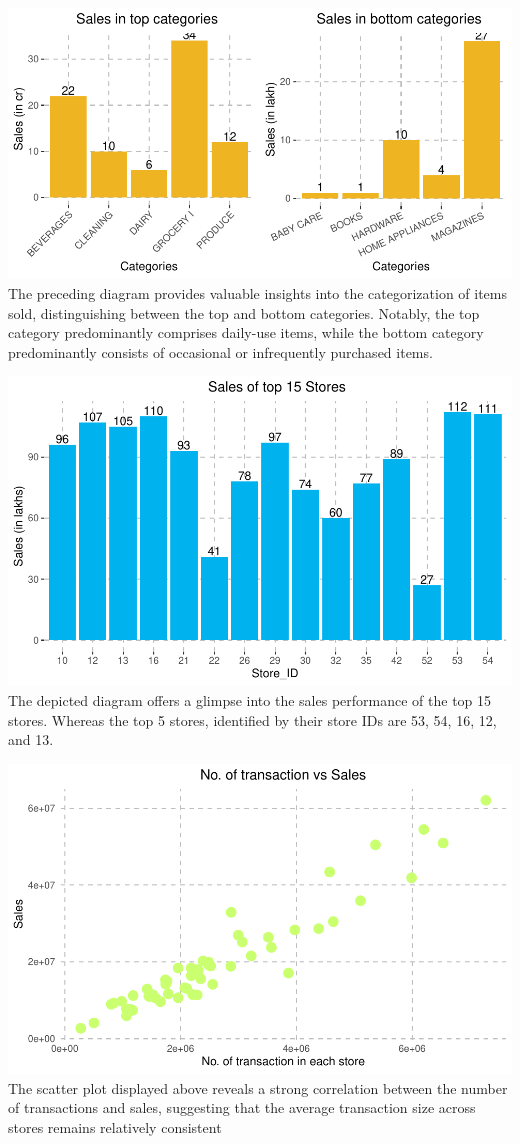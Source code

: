 \documentclass[
]{article}
\begin{document}
\includegraphics{Visualisation-Project_files/figure-latex/Ploting Family wise plot-1.pdf}
The preceding diagram provides valuable insights into the categorization
of items sold, distinguishing between the top and bottom categories.
Notably, the top category predominantly comprises daily-use items, while
the bottom category predominantly consists of occasional or infrequently
purchased items.

\includegraphics{Visualisation-Project_files/figure-latex/Plotting sales of top 15 stores-1.pdf}
The depicted diagram offers a glimpse into the sales performance of the
top 15 stores. Whereas the top 5 stores, identified by their store IDs
are 53, 54, 16, 12, and 13.

\includegraphics{Visualisation-Project_files/figure-latex/Transaction vs sales-1.pdf}
The scatter plot displayed above reveals a strong correlation between
the number of transactions and sales, suggesting that the average
transaction size across stores remains relatively consistent
\end{document}
